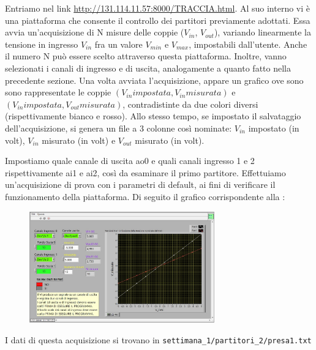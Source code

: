 
Entriamo nel link \textcolor{airforceblue}{\url{http://131.114.11.57:8000/TRACCIA.html}}. Al suo interno vi è una piattaforma che consente il controllo dei partitori previamente adottati. Essa avvia un'acquisizione di N misure delle coppie ($V_{in}$, $V_{out}$), variando linearmente la tensione in ingresso $V_{in}$ fra un valore $V_{min}$ e $V_{max}$, impostabili dall'utente. Anche il numero N può essere scelto attraverso questa piattaforma. Inoltre, vanno selezionati i canali di ingresso e di uscita, analogamente a quanto fatto nella precedente sezione.
Una volta avviata l'acquisizione, appare un grafico ove sono sono rappresentate le coppie $(V_{in} impostata, V_{in} misurata)$ e $(V_{in} impostata, V_{out} misurata)$, contradistinte da due colori diversi (rispettivamente bianco e rosso). Allo stesso tempo, se impostato il salvataggio dell'acquisizione, si genera un file a 3 colonne così nominate: $V_{in}$ impostato (in volt), $V_{in}$ misurato (in volt) e $V_{out}$ misurato (in volt). 

Impostiamo quale canale di uscita ao0 e quali canali ingresso 1 e 2 rispettivamente ai1 e ai2, così da esaminare il primo partitore. Effettuiamo un'acquisizione di prova con i parametri di default, ai fini di verificare il funzionamento della piattaforma.
Di seguito il grafico corrispondente alla :
\begin{figure}[H]
\caption{}
    \includegraphics[width=8cm]{settimana_1/immagini/traccia_prova.jpg}
    \centering
\end{figure}
I dati di questa acquisizione si trovano in \verb+settimana_1/partitori_2/presa1.txt+


